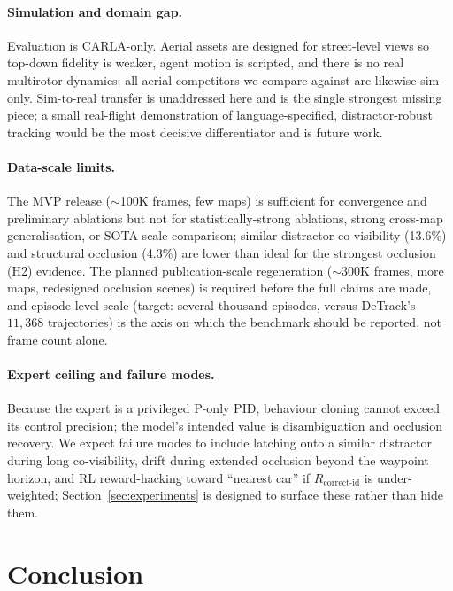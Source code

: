 \documentclass[11pt]{article}
\begin{document}
\paragraph{Simulation and domain gap.}
Evaluation is CARLA-only. Aerial assets are designed for street-level views
so top-down fidelity is weaker, agent motion is scripted, and there is no
real multirotor dynamics; all aerial competitors we compare against are
likewise sim-only. Sim-to-real transfer is unaddressed here and is the single
strongest missing piece; a small real-flight demonstration of
language-specified, distractor-robust tracking would be the most decisive
differentiator and is future work.

\paragraph{Data-scale limits.}
The MVP release ($\sim$100K frames, few maps) is sufficient for convergence
and preliminary ablations but not for statistically-strong ablations, strong
cross-map generalisation, or SOTA-scale comparison; similar-distractor
co-visibility (13.6\%) and structural occlusion
(4.3\%) are lower than ideal for the strongest occlusion (H2)
evidence. The planned publication-scale regeneration ($\sim$300K frames,
more maps, redesigned occlusion scenes) is required before the full claims
are made, and episode-level scale (target: several thousand episodes, versus
DeTrack's $11{,}368$ trajectories) is the axis on which the benchmark should
be reported, not frame count alone.

\paragraph{Expert ceiling and failure modes.}
Because the expert is a privileged P-only PID, behaviour cloning cannot
exceed its control precision; the model's intended value is disambiguation
and occlusion recovery. We expect failure modes to include latching onto a
similar distractor during long co-visibility, drift during extended
occlusion beyond the waypoint horizon, and RL reward-hacking toward
``nearest car'' if $R_{\mathrm{correct\text{-}id}}$ is under-weighted;
Section~\ref{sec:experiments} is designed to surface these rather than hide
them.

\section{Conclusion}
\label{sec:conclusion}
\end{document}
